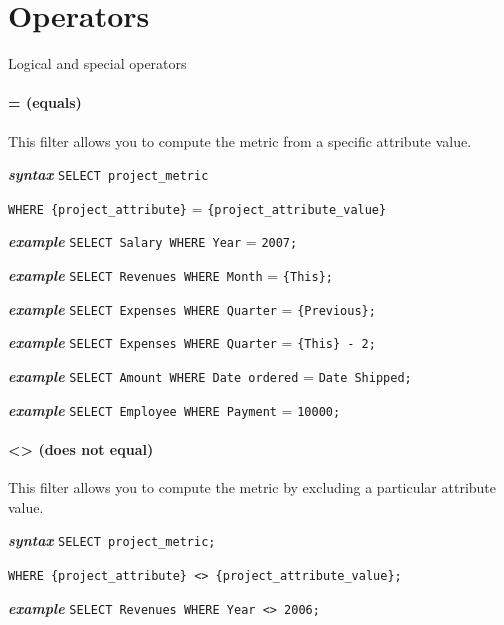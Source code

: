 \documentclass[a4paper, 12pt, titlepage, fleqn]{article}
\begin{document}
\section{Operators}
\label{operators}
Logical and special operators
\paragraph*{= (equals)} This filter allows you to compute the metric from a specific attribute value.

\textbf{\emph{syntax}}  \hspace{.9cm}\verb=SELECT project_metric= 

\hspace{2.2cm}\verb=WHERE {project_attribute}= = \verb={project_attribute_value}=

\textbf{\emph{example}}  \hspace{.9cm}\verb=SELECT Salary WHERE Year= = \verb=2007;=

\textbf{\emph{example}}  \hspace{.9cm}\verb=SELECT Revenues WHERE Month= = \verb={This};=

\textbf{\emph{example}}  \hspace{.9cm}\verb=SELECT Expenses WHERE Quarter= = \verb={Previous};=

\textbf{\emph{example}}  \hspace{.9cm}\verb=SELECT Expenses WHERE Quarter= = \verb={This} - 2;=

\textbf{\emph{example}}  \hspace{.9cm}\verb=SELECT Amount WHERE Date ordered= = \verb=Date Shipped;=

\textbf{\emph{example}}  \hspace{.9cm}\verb=SELECT Employee WHERE Payment= = \verb=10000;=

\paragraph*{<> (does not equal)} This filter allows you to compute the metric by excluding a particular attribute value.

\textbf{\emph{syntax}}  \hspace{.9cm}\verb=SELECT project_metric;=

\hspace{2.2cm}\verb=WHERE {project_attribute} <> {project_attribute_value};=

\textbf{\emph{example}}  \hspace{.9cm}\verb=SELECT Revenues WHERE Year <> 2006;=
\end{document}
